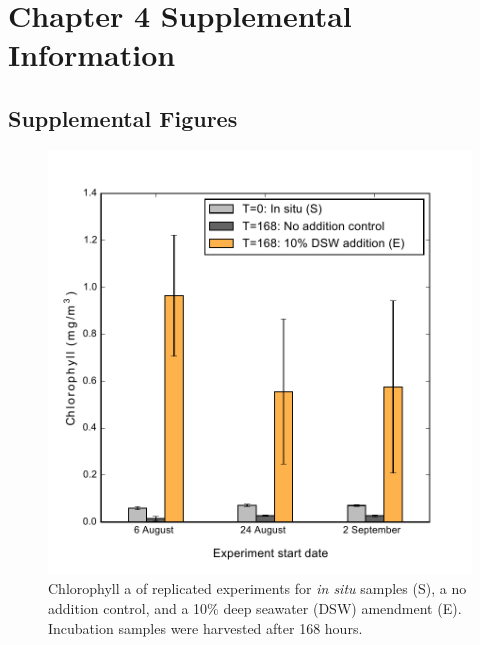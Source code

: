 


\chapter{Chapter 4 Supplemental Information}
\clearpage
\section{Supplemental Figures}

\begin{figure}[h!]
  \centering
    \includegraphics[width=1\textwidth]{Images/C4_FigureS1.pdf}
    \caption[Chlorophyll a of replicated experiments for \emph{in situ} samples, no addition control, and a 10\% deep seawater amendment]{Chlorophyll a of replicated experiments for \emph{in situ} samples (S), a no addition control, and a 10\% deep seawater (DSW) amendment (E). Incubation samples were harvested after 168 hours.}
  \label{fig:a4f1}
\end{figure}


